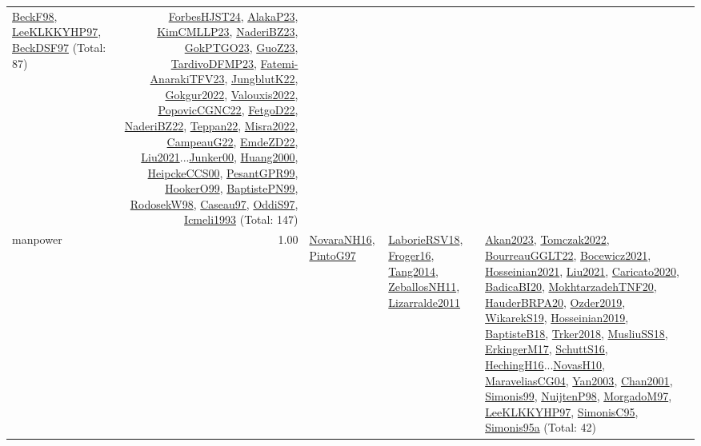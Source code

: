 {\begin{longtable}{p{3cm}r>{\raggedright\arraybackslash}p{6cm}>{\raggedright\arraybackslash}p{6cm}>{\raggedright\arraybackslash}p{8cm}}
\hyperref[detail:BeckF98]{BeckF98}, \hyperref[detail:LeeKLKKYHP97]{LeeKLKKYHP97}, \hyperref[detail:BeckDSF97]{BeckDSF97} (Total: 87) & \hyperref[detail:ForbesHJST24]{ForbesHJST24}, \hyperref[detail:AlakaP23]{AlakaP23}, \hyperref[detail:KimCMLLP23]{KimCMLLP23}, \hyperref[detail:NaderiBZ23]{NaderiBZ23}, \hyperref[detail:GokPTGO23]{GokPTGO23}, \hyperref[detail:GuoZ23]{GuoZ23}, \hyperref[detail:TardivoDFMP23]{TardivoDFMP23}, \hyperref[detail:Fatemi-AnarakiTFV23]{Fatemi-AnarakiTFV23}, \hyperref[detail:JungblutK22]{JungblutK22}, \hyperref[detail:Gokgur2022]{Gokgur2022}, \hyperref[detail:Valouxis2022]{Valouxis2022}, \hyperref[detail:PopovicCGNC22]{PopovicCGNC22}, \hyperref[detail:FetgoD22]{FetgoD22}, \hyperref[detail:NaderiBZ22]{NaderiBZ22}, \hyperref[detail:Teppan22]{Teppan22}, \hyperref[detail:Misra2022]{Misra2022}, \hyperref[detail:CampeauG22]{CampeauG22}, \hyperref[detail:EmdeZD22]{EmdeZD22}, \hyperref[detail:Liu2021]{Liu2021}...\hyperref[detail:Junker00]{Junker00}, \hyperref[detail:Huang2000]{Huang2000}, \hyperref[detail:HeipckeCCS00]{HeipckeCCS00}, \hyperref[detail:PesantGPR99]{PesantGPR99}, \hyperref[detail:HookerO99]{HookerO99}, \hyperref[detail:BaptistePN99]{BaptistePN99}, \hyperref[detail:RodosekW98]{RodosekW98}, \hyperref[detail:Caseau97]{Caseau97}, \hyperref[detail:OddiS97]{OddiS97}, \hyperref[detail:Icmeli1993]{Icmeli1993} (Total: 147)\\
\index{manpower}\index{Concepts!manpower}manpower &  1.00 & \hyperref[detail:NovaraNH16]{NovaraNH16}, \hyperref[detail:PintoG97]{PintoG97} & \hyperref[detail:LaborieRSV18]{LaborieRSV18}, \hyperref[detail:Froger16]{Froger16}, \hyperref[detail:Tang2014]{Tang2014}, \hyperref[detail:ZeballosNH11]{ZeballosNH11}, \hyperref[detail:Lizarralde2011]{Lizarralde2011} & \hyperref[detail:Akan2023]{Akan2023}, \hyperref[detail:Tomczak2022]{Tomczak2022}, \hyperref[detail:BourreauGGLT22]{BourreauGGLT22}, \hyperref[detail:Bocewicz2021]{Bocewicz2021}, \hyperref[detail:Hosseinian2021]{Hosseinian2021}, \hyperref[detail:Liu2021]{Liu2021}, \hyperref[detail:Caricato2020]{Caricato2020}, \hyperref[detail:BadicaBI20]{BadicaBI20}, \hyperref[detail:MokhtarzadehTNF20]{MokhtarzadehTNF20}, \hyperref[detail:HauderBRPA20]{HauderBRPA20}, \hyperref[detail:Ozder2019]{Ozder2019}, \hyperref[detail:WikarekS19]{WikarekS19}, \hyperref[detail:Hosseinian2019]{Hosseinian2019}, \hyperref[detail:BaptisteB18]{BaptisteB18}, \hyperref[detail:Trker2018]{Trker2018}, \hyperref[detail:MusliuSS18]{MusliuSS18}, \hyperref[detail:ErkingerM17]{ErkingerM17}, \hyperref[detail:SchuttS16]{SchuttS16}, \hyperref[detail:HechingH16]{HechingH16}...\hyperref[detail:NovasH10]{NovasH10}, \hyperref[detail:MaraveliasCG04]{MaraveliasCG04}, \hyperref[detail:Yan2003]{Yan2003}, \hyperref[detail:Chan2001]{Chan2001}, \hyperref[detail:Simonis99]{Simonis99}, \hyperref[detail:NuijtenP98]{NuijtenP98}, \hyperref[detail:MorgadoM97]{MorgadoM97}, \hyperref[detail:LeeKLKKYHP97]{LeeKLKKYHP97}, \hyperref[detail:SimonisC95]{SimonisC95}, \hyperref[detail:Simonis95a]{Simonis95a} (Total: 42)\\

\end{longtable}}

